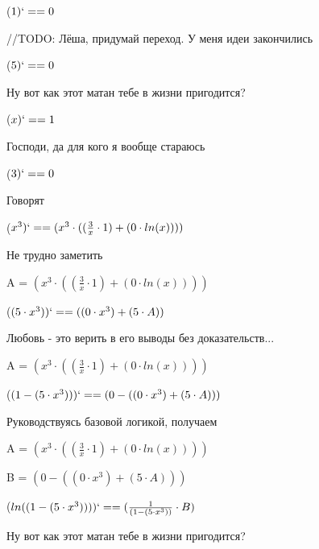 \documentclass[12pt,a4paper,fleqn]{article}
\begin{document}
\begin{center}
 ($1)`
 =  = 0$\end{center}
//TODO: Лёша, придумай переход. У меня идеи закончились

\begin{center}
 ($5)`
 =  = 0$\end{center}
Ну вот как этот матан тебе в жизни пригодится?

\begin{center}
 ($x)`
 =  = 1$\end{center}
Господи, да для кого я вообще стараюсь

\begin{center}
 ($3)`
 =  = 0$\end{center}
Говорят

\begin{center}
 ($x^{3})`
 =  = (x^{3} \cdot ((\frac{3}{x} \cdot 1) + (0 \cdot ln(x))))$\end{center}
Не трудно заметить

\begin{center}
A = $(x^{3} \cdot ((\frac{3}{x} \cdot 1) + (0 \cdot ln(x))))$\end{center}
\begin{center}
 ($(5 \cdot x^{3}))`
 =  = ((0 \cdot x^{3}) + (5 \cdot A))$\end{center}
Любовь - это верить в его выводы без доказательств...

\begin{center}
A = $(x^{3} \cdot ((\frac{3}{x} \cdot 1) + (0 \cdot ln(x))))$\end{center}
\begin{center}
 ($(1 - (5 \cdot x^{3})))`
 =  = (0 - ((0 \cdot x^{3}) + (5 \cdot A)))$\end{center}
Руководствуясь базовой логикой, получаем

\begin{center}
A = $(x^{3} \cdot ((\frac{3}{x} \cdot 1) + (0 \cdot ln(x))))$\end{center}
\begin{center}
B = $(0 - ((0 \cdot x^{3}) + (5 \cdot A)))$\end{center}
\begin{center}
 ($ln((1 - (5 \cdot x^{3}))))`
 =  = (\frac{1}{(1 - (5 \cdot x^{3}))} \cdot B)$\end{center}
Ну вот как этот матан тебе в жизни пригодится?
\end{document}
